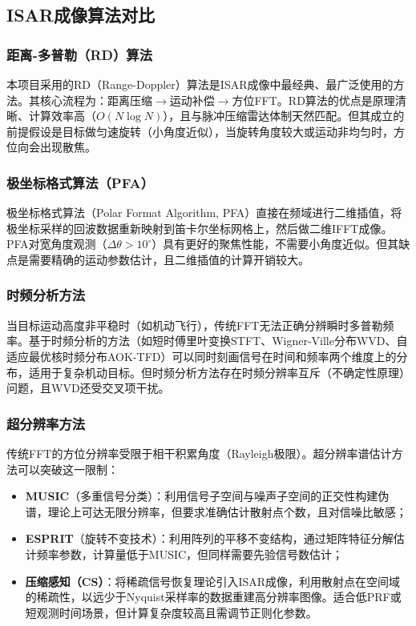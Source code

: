 \documentclass[12pt, a4paper]{article}
\begin{document}
\subsection{ISAR成像算法对比}

\subsubsection{距离-多普勒（RD）算法}

本项目采用的RD（Range-Doppler）算法是ISAR成像中最经典、最广泛使用的方法\cite{ref_isar_chen}。其核心流程为：距离压缩$\to$运动补偿$\to$方位FFT。RD算法的优点是原理清晰、计算效率高（$O(N\log N)$），且与脉冲压缩雷达体制天然匹配。但其成立的前提假设是目标做匀速旋转（小角度近似），当旋转角度较大或运动非均匀时，方位向会出现散焦。

\subsubsection{极坐标格式算法（PFA）}

极坐标格式算法（Polar Format Algorithm, PFA）\cite{ref_pfa}直接在频域进行二维插值，将极坐标采样的回波数据重新映射到笛卡尔坐标网格上，然后做二维IFFT成像。PFA对宽角度观测（$\Delta\theta > 10^\circ$）具有更好的聚焦性能，不需要小角度近似。但其缺点是需要精确的运动参数估计，且二维插值的计算开销较大。

\subsubsection{时频分析方法}

当目标运动高度非平稳时（如机动飞行），传统FFT无法正确分辨瞬时多普勒频率。基于时频分析的方法（如短时傅里叶变换STFT\cite{ref_stft_isar}、Wigner-Ville分布WVD\cite{ref_wvd}、自适应最优核时频分布AOK-TFD\cite{ref_aok}）可以同时刻画信号在时间和频率两个维度上的分布，适用于复杂机动目标。但时频分析方法存在时频分辨率互斥（不确定性原理）问题，且WVD还受交叉项干扰。

\subsubsection{超分辨率方法}

传统FFT的方位分辨率受限于相干积累角度（Rayleigh极限）。超分辨率谱估计方法可以突破这一限制：

\begin{itemize}
  \item \textbf{MUSIC}（多重信号分类）\cite{ref_music}：利用信号子空间与噪声子空间的正交性构建伪谱，理论上可达无限分辨率，但要求准确估计散射点个数，且对信噪比敏感；
  \item \textbf{ESPRIT}（旋转不变技术）\cite{ref_esprit}：利用阵列的平移不变结构，通过矩阵特征分解估计频率参数，计算量低于MUSIC，但同样需要先验信号数估计；
  \item \textbf{压缩感知（CS）}\cite{ref_cs_isar}：将稀疏信号恢复理论引入ISAR成像，利用散射点在空间域的稀疏性，以远少于Nyquist采样率的数据重建高分辨率图像。适合低PRF或短观测时间场景，但计算复杂度较高且需调节正则化参数。
\end{itemize}
\end{document}
